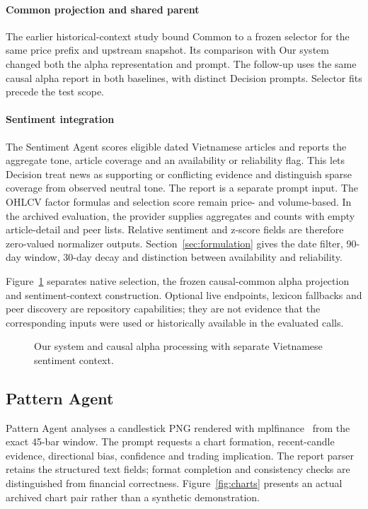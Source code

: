 \paragraph{Common projection and shared parent}
The earlier historical-context study bound Common to a frozen selector for the same price prefix and upstream snapshot. Its comparison with Our system changed both the alpha representation and prompt. The follow-up uses the same causal alpha report in both baselines, with distinct Decision prompts. Selector fits precede the test scope.

\paragraph{Sentiment integration}
The Sentiment Agent scores eligible dated Vietnamese articles and reports the aggregate tone, article coverage and an availability or reliability flag. This lets Decision treat news as supporting or conflicting evidence and distinguish sparse coverage from observed neutral tone. The report is a separate prompt input. The OHLCV factor formulas and selection score remain price- and volume-based. In the archived evaluation, the provider supplies aggregates and counts with empty article-detail and peer lists. Relative sentiment and z-score fields are therefore zero-valued normalizer outputs. Section~\ref{sec:formulation} gives the date filter, 90-day window, 30-day decay and distinction between availability and reliability.

Figure~\ref{fig:alpha_agent} separates native selection, the frozen causal-common alpha projection and sentiment-context construction. Optional live endpoints, lexicon fallbacks and peer discovery are repository capabilities; they are not evidence that the corresponding inputs were used or historically available in the evaluated calls.

\begin{figure}[!htb]
\centering
\caption{Our system and causal alpha processing with separate Vietnamese sentiment context.}
\label{fig:alpha_agent}
\end{figure}

\subsection{Pattern Agent}
Pattern Agent analyses a candlestick PNG rendered with mplfinance~\cite{mplfinance_docs} from the exact 45-bar window. The prompt requests a chart formation, recent-candle evidence, directional bias, confidence and trading implication. The report parser retains the structured text fields; format completion and consistency checks are distinguished from financial correctness. Figure~\ref{fig:charts} presents an actual archived chart pair rather than a synthetic demonstration.

